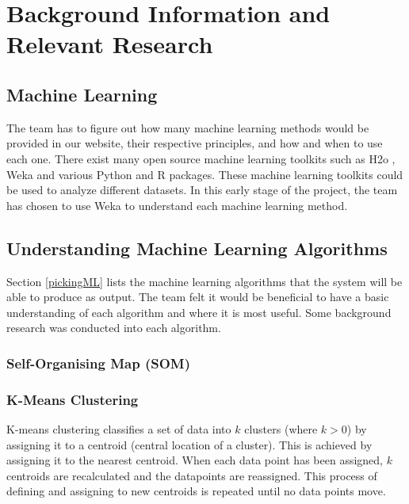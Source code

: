 \documentclass[titlepage]{article}
\begin{document}
\section{Background Information and \\Relevant Research}
\subsection{Machine Learning}
The team has to figure out how many machine learning methods would be provided in our website, their respective principles, and how and when to use each one.
There exist many open source machine learning toolkits such as H2o \cite{h2o.ai}, Weka \cite{weka} and various Python and R packages. These machine learning toolkits could be used to analyze different datasets. In this early stage of the project, the team has chosen to use Weka to understand each machine learning method.

\subsection{Understanding Machine Learning Algorithms}
Section \ref{pickingML} lists the machine learning algorithms that the system will be able to produce as output. The team felt it would be beneficial to have a basic understanding of each algorithm and where it is most useful. Some background research was conducted into each algorithm.

\subsubsection*{Self-Organising Map (SOM)}
\subsubsection*{K-Means Clustering}
K-means clustering classifies a set of data into $k$ clusters (where $k > 0$) by assigning it to a centroid (central location of a cluster). This is achieved by assigning it to the nearest centroid. When each data point has been assigned, $k$ centroids are recalculated and the datapoints are reassigned. This process of defining and assigning to new centroids is repeated until no data points move.\cite{kmeans}
\end{document}
